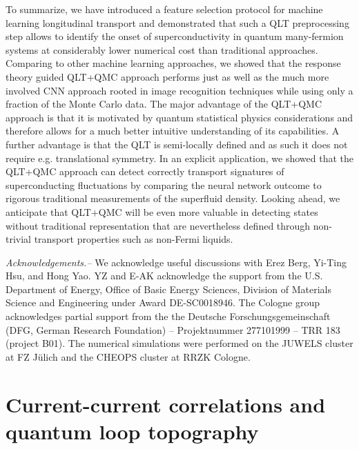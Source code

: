 \documentclass[amsmath,amssymb, aps, prx, longbibliography, twocolumn]{revtex4-1}
\begin{document}
%
To summarize, we have introduced a feature selection protocol for machine learning longitudinal transport and demonstrated that such a QLT preprocessing step allows to identify the onset of superconductivity in quantum many-fermion systems at considerably lower numerical cost than traditional approaches.
Comparing to other machine learning approaches, we showed that the response theory guided QLT+QMC approach performs just as well as the much more involved CNN approach rooted in image recognition techniques while using only a fraction of the Monte Carlo data. The major advantage of the QLT+QMC approach is that it is motivated by quantum statistical physics considerations and therefore allows for a much better intuitive understanding of its capabilities. A further advantage is that the  QLT is semi-locally defined and as such it does not require e.g. translational symmetry.
In an explicit application, we showed that the QLT+QMC approach can detect correctly transport signatures of superconducting fluctuations by comparing the neural network outcome to rigorous traditional measurements of the superfluid density. 
Looking ahead, we anticipate that QLT+QMC will be even more valuable in detecting states without traditional representation that are nevertheless defined through non-trivial transport properties such as non-Fermi liquids. 



{\it Acknowledgements.--} 
We acknowledge useful discussions with Erez Berg, Yi-Ting Hsu, and Hong Yao. YZ and E-AK acknowledge the support from the U.S. Department of Energy, Office of Basic Energy Sciences, Division of Materials Science and Engineering under Award DE-SC0018946.
The Cologne group acknowledges partial support from the the Deutsche Forschungsgemeinschaft (DFG, German Research Foundation) -- Projektnummer 277101999 -- TRR 183 (project B01).
The numerical simulations were performed on the JUWELS cluster at FZ J\"ulich and the CHEOPS cluster at RRZK Cologne.


%

\appendix

\section{Current-current correlations and quantum loop topography}
\end{document}
